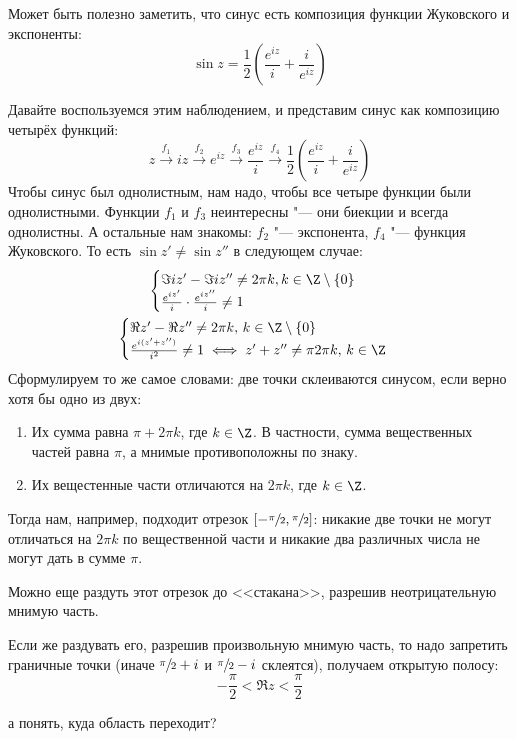 	\begin{Rem}
		Может быть полезно заметить, что синус есть композиция функции Жуковского и экспоненты:
		\[ \sin z = \frac{1}{2} \left(\frac{e^{iz}}{i}+\frac{i}{e^{iz}}\right) \]
	\end{Rem}

	Давайте воспользуемся этим наблюдением, и представим синус как композицию четырёх функций:
	\[
		z
		\xrightarrow{f_1}
		iz
		\xrightarrow{f_2}
		e^{iz}
		\xrightarrow{f_3}
		\frac{e^{iz}}{i}
		\xrightarrow{f_4}
		\frac12\left(\frac{e^{iz}}{i}+\frac{i}{e^{iz}}\right)
	\]
	Чтобы синус был однолистным, нам надо, чтобы все четыре функции были однолистными.
	Функции $f_1$ и $f_3$ неинтересны "--- они биекции и всегда однолистны.
	А остальные нам знакомы: $f_2$ "--- экспонента, $f_4$ "--- функция Жуковского.
	То есть $\sin z' \neq \sin z''$ в следующем случае:
	\begin{gather*}
		\begin{cases}
			\Im iz' - \Im iz'' \neq 2\pi k, k \in \Z \setminus \{ 0 \} \\
			\frac{e^{iz'}}{i} \cdot \frac{e^{iz''}}{i} \neq 1
		\end{cases} \\
		\begin{cases}
			\Re z' - \Re z'' \neq 2\pi k,\, k \in \Z \setminus \{ 0 \} \\
			\frac{e^{i(z'+z'')}}{i^2} \neq 1 \iff
			z'+z'' \neq \pi 2\pi k,\, k \in \Z
		\end{cases}
	\end{gather*}
	Сформулируем то же самое словами: две точки склеиваются синусом, если верно хотя бы одно из двух:
	\begin{enumerate}
		\item
			Их сумма равна $\pi + 2\pi k$, где $k \in \Z$.
			В частности, сумма вещественных частей равна $\pi$, а мнимые противоположны по знаку.
		\item
			Их вещестенные части отличаются на $2\pi k$, где $k \in \Z$.
	\end{enumerate}
	Тогда нам, например, подходит отрезок $[-\sfrac \pi 2, \sfrac \pi 2]$:
	никакие две точки не могут отличаться на $2\pi k$ по вещественной части и никакие
	два различных числа не могут дать в сумме $\pi$.

	Можно еще раздуть этот отрезок до <<стакана>>, разрешив неотрицательную мнимую часть.

	Если же раздувать его, разрешив произвольную мнимую часть, то надо запретить граничные
	точки (иначе $\sfrac{\pi}2+i$ и $\sfrac{\pi}2-i$ склеятся), получаем открытую полосу:
	\[ -\frac \pi 2 < \Re z < \frac \pi 2 \]

	\TODO а понять, куда область переходит?
